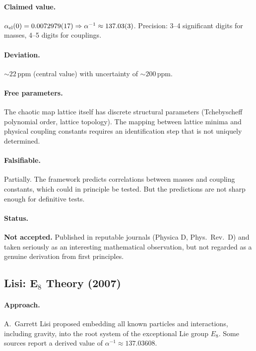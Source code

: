\documentclass[11pt,a4paper]{article}
\begin{document}
\paragraph{Claimed value.}
$\alpha_{\rm el}(0) = 0.0072979(17) \Rightarrow \alpha^{-1}\approx 137.03(3)$.
Precision: 3--4 significant digits for masses, 4--5 digits for couplings.

\paragraph{Deviation.}
$\sim 22$\,ppm (central value) with uncertainty of $\sim 200$\,ppm.

\paragraph{Free parameters.}
The chaotic map lattice itself has discrete structural parameters (Tchebyscheff polynomial order, lattice topology).  The mapping between lattice minima and physical coupling constants requires an identification step that is not uniquely determined.

\paragraph{Falsifiable.}
Partially.  The framework predicts correlations between masses and coupling constants, which could in principle be tested.  But the predictions are not sharp enough for definitive tests.

\paragraph{Status.}
\textbf{Not accepted.}  Published in reputable journals (Physica D, Phys.\ Rev.\ D) and taken seriously as an interesting mathematical observation, but not regarded as a genuine derivation from first principles.

\subsection{Lisi: E$_8$ Theory (2007)}\label{sec:lisi}

\paragraph{Approach.}
A.\ Garrett Lisi proposed embedding all known particles and interactions, including gravity, into the root system of the exceptional Lie group $E_8$.  Some sources report a derived value of $\alpha^{-1}\approx 137.03608$.
\end{document}
